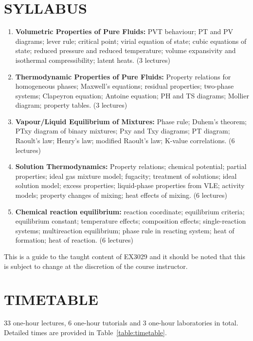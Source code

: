 \documentclass[12pts,a4paper,amsmath,amssymb,floatfix]{article}%
\begin{document}
\section{SYLLABUS}
\begin{enumerate}[{\bf 1.}]
\item {\bf Volumetric Properties of Pure Fluids:} PVT behaviour; PT and PV diagrams; lever rule; critical point; virial equation of state; cubic equations of state; reduced pressure and reduced temperature; volume expansivity and isothermal compressibility; latent heats.  (3 lectures)
\item {\bf Thermodynamic Properties of Pure Fluids:} Property relations for homogeneous phases; Maxwell's equations; residual properties; two-phase systems; Clapeyron equation; Antoine equation; PH and TS diagrams; Mollier diagram; property tables.  (3 lectures)
\item {\bf Vapour/Liquid Equilibrium of Mixtures:} Phase rule; Duhem’s theorem; PTxy diagram of binary mixtures; Pxy and Txy diagrams; PT diagram; Raoult's law; Henry's law; modified Raoult's law; K-value correlations.  (6 lectures)
\item {\bf Solution Thermodynamics:} Property relations; chemical potential; partial properties; ideal gas mixture model; fugacity; treatment of solutions; ideal solution model; excess properties; liquid-phase properties from VLE; activity models; property changes of mixing; heat effects of mixing.  (6 lectures)
\item {\bf Chemical reaction equilibrium:} reaction coordinate; equilibrium criteria; equilibrium constant; temperature effects; composition effects; single-reaction systems; multireaction equilibrium; phase rule in reacting system; heat of formation; heat of reaction.  (6 lectures)
\end{enumerate}

\medskip
This is a guide to the taught content of EX3029 and it should be noted that this is subject to change at the discretion of the course instructor.


\section{TIMETABLE}
33 one-hour lectures, 6 one-hour tutorials and 3 one-hour laboratories in total. Detailed times are provided in Table~\ref{table:timetable}.
\end{document}
